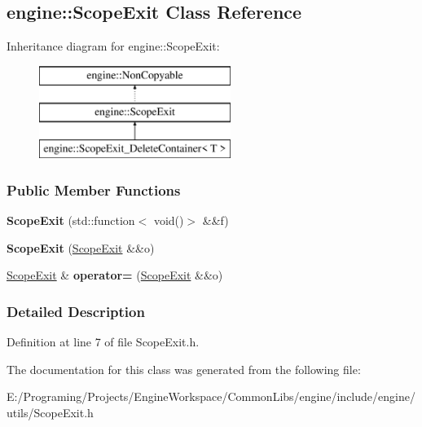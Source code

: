\hypertarget{a00063}{}\subsection{engine\+:\+:Scope\+Exit Class Reference}
\label{a00063}
Inheritance diagram for engine\+:\+:Scope\+Exit\+:\begin{figure}[H]
\begin{center}
\leavevmode
\includegraphics[height=3.000000cm]{a00063}
\end{center}
\end{figure}
\subsubsection*{Public Member Functions}
\begin{DoxyCompactItemize}
\item 
{\bfseries Scope\+Exit} (std\+::function$<$ void()$>$ \&\&f)\hypertarget{a00063_a6003e466fdda9061f2916b7e13265047}{}\label{a00063_a6003e466fdda9061f2916b7e13265047}

\item 
{\bfseries Scope\+Exit} (\hyperlink{a00063}{Scope\+Exit} \&\&o)\hypertarget{a00063_ad4bcbbc60dd9951caadca85b22688efb}{}\label{a00063_ad4bcbbc60dd9951caadca85b22688efb}

\item 
\hyperlink{a00063}{Scope\+Exit} \& {\bfseries operator=} (\hyperlink{a00063}{Scope\+Exit} \&\&o)\hypertarget{a00063_aa03378e947cf4ed0d2802d37384a35a4}{}\label{a00063_aa03378e947cf4ed0d2802d37384a35a4}

\end{DoxyCompactItemize}


\subsubsection{Detailed Description}


Definition at line 7 of file Scope\+Exit.\+h.



The documentation for this class was generated from the following file\+:\begin{DoxyCompactItemize}
\item 
E\+:/\+Programing/\+Projects/\+Engine\+Workspace/\+Common\+Libs/engine/include/engine/utils/Scope\+Exit.\+h\end{DoxyCompactItemize}
